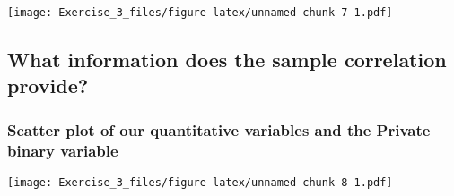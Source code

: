 \documentclass[]{article}
\newenvironment{Shaded}{\begin{snugshade}}{\end{snugshade}}
\newcommand{\KeywordTok}[1]{\textcolor[rgb]{0.13,0.29,0.53}{\textbf{#1}}}
\newcommand{\NormalTok}[1]{#1}
\newcommand{\OperatorTok}[1]{\textcolor[rgb]{0.81,0.36,0.00}{\textbf{#1}}}
\begin{document}
\texttt{[image: Exercise\_3\_files/figure-latex/unnamed-chunk-7-1.pdf]}

\newpage

\hypertarget{what-information-does-the-sample-correlation-provide}{%
\subsection{What information does the sample correlation
provide?}\label{what-information-does-the-sample-correlation-provide}}

\hypertarget{scatter-plot-of-our-quantitative-variables-and-the-private-binary-variable}{%
\subsubsection{Scatter plot of our quantitative variables and the
Private binary
variable}\label{scatter-plot-of-our-quantitative-variables-and-the-private-binary-variable}}

\begin{Shaded}
\end{Shaded}

\texttt{[image: Exercise\_3\_files/figure-latex/unnamed-chunk-8-1.pdf]}
\end{document}
